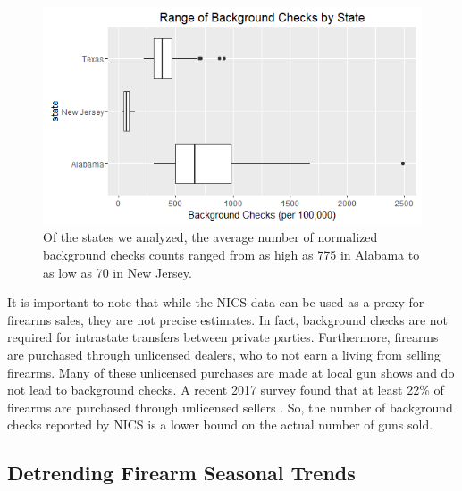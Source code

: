 \documentclass[9pt,twocolumn,twoside,lineno]{pnas-new}
\begin{document}
\begin{figure}%
  \centering
  \includegraphics[width=\linewidth]{figures/boxplot}
  \caption{Of the states we analyzed, the average number of normalized background checks counts ranged from as high as 775 in Alabama to as low as 70 in New Jersey.}
  \label{fig:boxplot}
\end{figure}
	It is important to note that while the NICS data can be used as a proxy for firearms sales, they are not precise estimates. In fact, background checks are not required for intrastate transfers between private parties. Furthermore, firearms are purchased through unlicensed dealers, who to not earn a living from selling firearms. Many of these unlicensed purchases are made at local gun shows and do not lead to background checks. A recent 2017 survey found that at least 22\% of firearms are purchased through unlicensed sellers \cite{miller_firearm_2017}. So, the number of background checks reported by NICS is a lower bound on the actual number of guns sold.
    
\subsection{Detrending Firearm Seasonal Trends}
\end{document}
